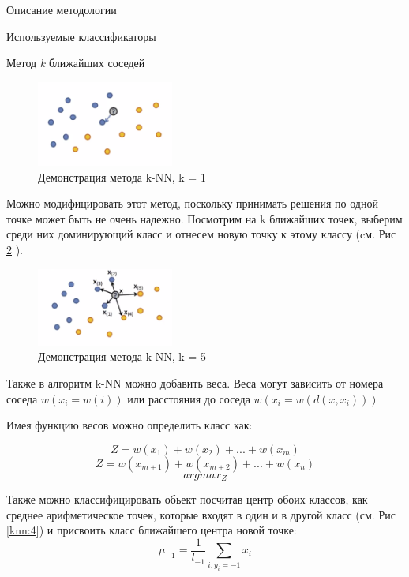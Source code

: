 \begin{section}{Описание методологии}
\begin{subsection}{Используемые классификаторы}
\begin{subsubsection}{Метод \textit{k} ближайших соседей}
\begin{figure}[ht!]
\centering
\includegraphics[width=0.4\textwidth]{pics/knn2}
\caption{Демонстрация метода k-NN, k = 1}
\label{pic:knn2}
\end{figure}

Можно модифицировать этот метод, поскольку принимать решения по одной точке может быть не очень надежно. Посмотрим на k ближайших точек, выберим среди них доминирующий класс и отнесем новую точку к этому классу (cм. Рис \ref{pic:knn3} ).

\begin{figure}[ht!]
\centering
\includegraphics[width=0.4\textwidth]{pics/knn3}
\caption{Демонстрация метода k-NN, k = 5}
\label{pic:knn3}
\end{figure}




Также в алгоритм k-NN можно добавить веса. Веса могут зависить от номера соседа $w(x_{i} = w(i))$ или расстояния до соседа $w(x_{i} = w(d(x, x_{i})))$

Имея функцию весов можно определить класс как:

\begin{equation}
Z = w(x_{1}) + w(x_{2}) + ... + w(x_{m})
\end{equation}
\begin{equation}
Z = w(x_{m + 1}) + w(x_{m + 2}) + ... + w(x_{n})
\end{equation}
\begin{equation}
arg⁡max_Z
\end{equation}

Также можно классифицировать обьект посчитав центр обоих классов, как среднее арифметическое точек, которые входят в один и в другой класс (см. Рис \ref{knn:4}) и присвоить класс ближайшего центра новой точке:
\begin{equation}
\mu_{-1} = \frac{1}{l_{-1}} \sum\limits_{i: y_i = -1} x_i
\end{equation}


\end{subsubsection}
\end{subsection}
\end{section}
